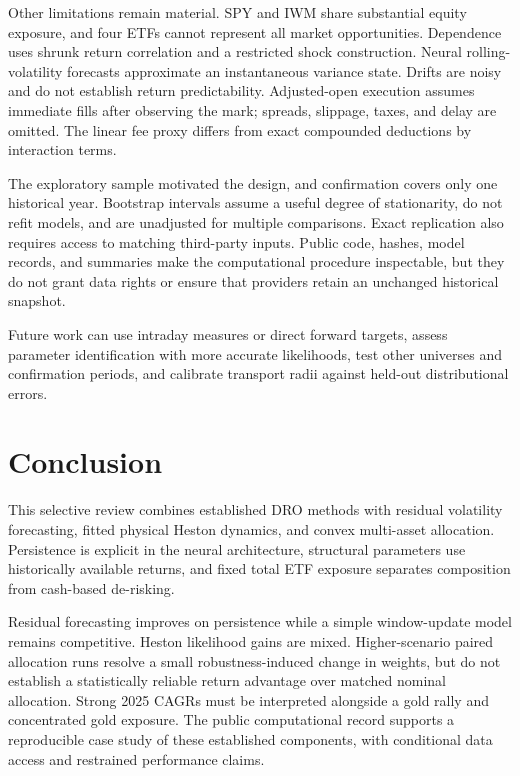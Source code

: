 Other limitations remain material. SPY and IWM share substantial equity exposure, and four ETFs cannot represent all market opportunities. Dependence uses shrunk return correlation and a restricted shock construction. Neural rolling-volatility forecasts approximate an instantaneous variance state. Drifts are noisy and do not establish return predictability. Adjusted-open execution assumes immediate fills after observing the mark; spreads, slippage, taxes, and delay are omitted. The linear fee proxy differs from exact compounded deductions by interaction terms.

The exploratory sample motivated the design, and confirmation covers only one historical year. Bootstrap intervals assume a useful degree of stationarity, do not refit models, and are unadjusted for multiple comparisons. Exact replication also requires access to matching third-party inputs. Public code, hashes, model records, and summaries make the computational procedure inspectable, but they do not grant data rights or ensure that providers retain an unchanged historical snapshot.

Future work can use intraday measures or direct forward targets, assess parameter identification with more accurate likelihoods, test other universes and confirmation periods, and calibrate transport radii against held-out distributional errors.

\section{Conclusion}
This selective review combines established DRO methods with residual volatility forecasting, fitted physical Heston dynamics, and convex multi-asset allocation. Persistence is explicit in the neural architecture, structural parameters use historically available returns, and fixed total ETF exposure separates composition from cash-based de-risking.

Residual forecasting improves on persistence while a simple window-update model remains competitive. Heston likelihood gains are mixed. Higher-scenario paired allocation runs resolve a small robustness-induced change in weights, but do not establish a statistically reliable return advantage over matched nominal allocation. Strong 2025 CAGRs must be interpreted alongside a gold rally and concentrated gold exposure. The public computational record supports a reproducible case study of these established components, with conditional data access and restrained performance claims.

